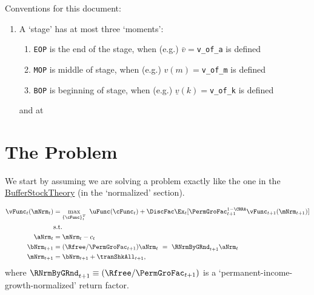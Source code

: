 \documentclass[\econtexRoot/BufferStockTheory]{subfiles}
\newcommand{\EOP}{\bar}
\newcommand{\MOP}{}
\newcommand{\BOP}{\underline}
\begin{document}


\hypertarget{ApndxSolutionSteps}{}

Conventions for this document:
\begin{enumerate}
\item A `stage' has at most three `moments':
  \begin{enumerate}
  \item \texttt{EOP} is the end of the stage, when (e.g.) $\EOP{v}=$\texttt{v\_of\_a} is defined
  \item \texttt{MOP} is middle of stage, when (e.g.) $\MOP{v}(m)=$\texttt{v\_of\_m} is defined
  \item \texttt{BOP} is beginning of stage, when (e.g.) $\BOP{v}(k)=$\texttt{v\_of\_k} is defined
  \end{enumerate}

  and at 

\end{enumerate}


\section{The Problem}

We start by assuming we are solving a problem exactly like the one in the \href{https://econ-ark.github.io/BufferStockTheory}{BufferStockTheory} (in the `normalized' section).

\begin{equation*}\label{eq:veqn}
  \begin{aligned}
    \vFunc_{t}(\mNrm_{t})  & = \max_{{\{\cFunc\}}_{t}^{T}}~  \uFunc(\cFunc_{t}) +\DiscFac \Ex_{t}[\PermGroFac_{t+1}^{1-\CRRA}\vFunc_{t+1}({\mNrm}_{t+1})]  \\
    & \mbox{s.t.}
    \\ {\aNrm}_{t}  & = \mNrm_{t}-c_{t}
    \\ {\bNrm}_{t+1}  & = (\Rfree/\PermGroFac_{t+1})\aNrm_{t}  ~ = ~ \RNrmByGRnd_{t+1}\aNrm_{t}
    \\ \mNrm_{t+1}  & = \bNrm_{t+1}+\tranShkAll_{t+1}  ,
  \end{aligned}
\end{equation*}
where $\RNrmByGRnd_{t+1}\equiv (\Rfree/\PermGroFac_{t+1})$ is a `permanent-income-growth-normalized' return factor.
\end{document}
